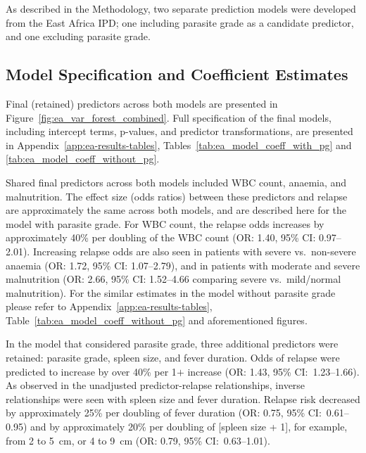 As described in the Methodology, two separate prediction models were developed from the East Africa IPD; one including parasite grade as a candidate predictor, and one excluding parasite grade.

\subsection{Model Specification and Coefficient Estimates}

Final (retained) predictors across both models are presented in Figure~\ref{fig:ea_var_forest_combined}. Full specification of the final models, including intercept terms, p-values, and predictor transformations, are presented in Appendix~\ref{app:ea-results-tables}, Tables~\ref{tab:ea_model_coeff_with_pg} and \ref{tab:ea_model_coeff_without_pg}.

Shared final predictors across both models included WBC count, anaemia, and malnutrition. The effect size (odds ratios) between these predictors and relapse are approximately the same across both models, and are described here for the model with parasite grade. For WBC count, the relapse odds increases by approximately 40\% per doubling of the WBC count (OR: 1.40, 95\% CI: 0.97--2.01). Increasing relapse odds are also seen in patients with severe vs.\ non-severe anaemia (OR: 1.72, 95\% CI: 1.07--2.79), and in patients with moderate and severe malnutrition (OR: 2.66, 95\% CI: 1.52--4.66 comparing severe vs.\ mild/normal malnutrition). For the similar estimates in the model without parasite grade please refer to Appendix~\ref{app:ea-results-tables}, Table~\ref{tab:ea_model_coeff_without_pg} and aforementioned figures.

In the model that considered parasite grade, three additional predictors were retained: parasite grade, spleen size, and fever duration. Odds of relapse were predicted to increase by over 40\% per 1$+$ increase (OR: 1.43, 95\% CI:~1.23--1.66). As observed in the unadjusted predictor-relapse relationships, inverse relationships were seen with spleen size and fever duration. Relapse risk decreased by approximately 25\% per doubling of fever duration (OR: 0.75, 95\% CI:~0.61--0.95) and by approximately 20\% per doubling of [spleen size + 1], for example, from 2 to 5~cm, or 4 to 9~cm (OR: 0.79, 95\% CI:~0.63--1.01).


